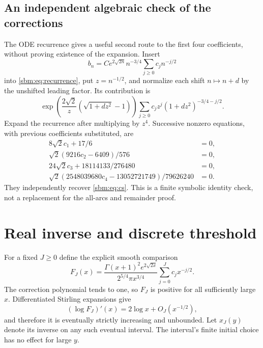 \documentclass[11pt,letterpaper]{article}
\numberwithin{equation}{section}
\theoremstyle{remark}\newtheorem{remark}[theorem]{Remark}
\begin{document}
\subsection*{An independent algebraic check of the corrections}
The ODE recurrence gives a useful second route to the first four
coefficients, without proving existence of the expansion. Insert
\[
 b_n=C e^{2\sqrt{2n}}n^{-3/4}\sum_{j\geq0}c_jn^{-j/2}
\]
into \eqref{sbm:eq:recurrence}, put $z=n^{-1/2}$, and normalize each shift
$n\mapsto n+d$ by the unshifted leading factor. Its contribution is
\[
 \exp\left(\frac{2\sqrt2}{z}
                  (\sqrt{1+dz^2}-1)\right)
 \sum_{j\geq0}c_jz^j(1+dz^2)^{-3/4-j/2}.
\]
Expand the recurrence after multiplying by $z^4$. Successive nonzero
equations, with previous coefficients substituted, are
\begin{align*}
 8\sqrt2c_1+17/6&=0,\\
 \sqrt2(9216c_2-6409)/576&=0,\\
 24\sqrt2c_3+18114133/276480&=0,\\
 \sqrt2(2548039680c_4-13052721749)/79626240&=0.
\end{align*}
They independently recover \eqref{sbm:eq:cs}. This is a finite symbolic
identity check, not a replacement for the all-arcs and remainder proof.

\section{Real inverse and discrete threshold}\label{sbm:sec:inverse}
For a fixed $J\geq0$ define the explicit smooth comparison
\begin{equation}\label{sbm:eq:FJ}
 F_J(x)=\frac{\Gamma(x+1)^2e^{2\sqrt{2x}}}
                   {2^{5/4}\pi x^{3/4}}
                \sum_{j=0}^Jc_jx^{-j/2}.
\end{equation}
The correction polynomial tends to one, so $F_J$ is positive for
all sufficiently large $x$. Differentiated Stirling expansions give
\begin{equation}\label{sbm:eq:derivative}
 (\log F_J)'(x)=2\log x+O_J(x^{-1/2}),
\end{equation}
and therefore it is eventually strictly increasing and unbounded.
Let $x_J(y)$ denote its inverse on any such eventual interval.
The interval's finite initial choice has no effect for large $y$.
\end{document}
